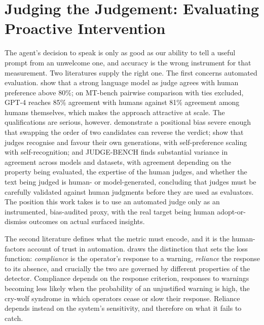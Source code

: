 \section{Judging the Judgement: Evaluating Proactive Intervention}
\label{sec:rw-evaluation}

The agent's decision to speak is only as good as our ability to tell a useful
prompt from an unwelcome one, and accuracy is the wrong instrument for that
measurement. Two literatures supply the right one. The first concerns
automated evaluation. \citet{zheng_judging_2023} show that a strong language
model as judge agrees with human preference above 80\%; on MT-bench pairwise
comparison with ties excluded, GPT-4 reaches 85\% agreement with humans against
81\% agreement among humans themselves, which makes the approach attractive at
scale. The qualifications are serious, however. \citet{wang_large_2024}
demonstrate a positional bias severe enough that swapping the order of two
candidates can reverse the verdict; \citet{panickssery_llm_2024} show that
judges recognise and favour their own generations, with self-preference scaling
with self-recognition; and JUDGE-BENCH \citep{bavaresco_llms_2025} finds
substantial variance in agreement across models and datasets, with agreement
depending on the property being evaluated, the expertise of the human judges,
and whether the text being judged is human- or model-generated, concluding that
judges must be carefully validated against human judgments before they are used
as evaluators. The position this work takes is to use an automated judge only
as an instrumented, bias-audited proxy, with the real target being human
adopt-or-dismiss outcomes on actual surfaced insights.

The second literature defines what the metric must encode, and it is the
human-factors account of trust in automation. \citet{meyer_conceptual_2004}
draws the distinction that sets the loss function: \emph{compliance} is the
operator's response to a warning, \emph{reliance} the response to its absence,
and crucially the two are governed by different properties of the detector.
Compliance depends on the response criterion, responses to warnings becoming
less likely when the probability of an unjustified warning is high, the
cry-wolf syndrome in which operators cease or slow their response. Reliance
depends instead on the system's sensitivity, and therefore on what it fails to
catch.

